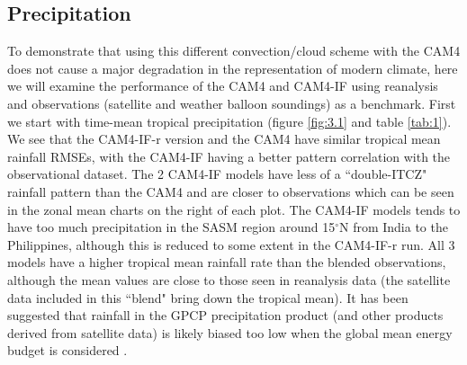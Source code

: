 \documentclass[letterpaper,12pt,titlepage,oneside,final]{book}
\begin{document}
\subsection{Precipitation}
To demonstrate that using this different convection/cloud scheme with the CAM4 does not cause a major degradation in the representation of modern climate, here we will examine the performance of the CAM4 and CAM4-IF using reanalysis and observations (satellite and weather balloon soundings) as a benchmark. First we start with time-mean tropical precipitation (figure \ref{fig:3.1} and table \ref{tab:1}). We see that the CAM4-IF-r version and the CAM4 have similar tropical mean rainfall RMSEs, with the CAM4-IF having a better pattern correlation with the observational dataset. The 2 CAM4-IF models  have less of a ``double-ITCZ" rainfall pattern than the CAM4 and are closer to observations which can be seen in the zonal mean charts on the right of each plot. The CAM4-IF models tends to have too much precipitation in the SASM region around 15$^\circ$N from India to the Philippines, although this is reduced to some extent in the CAM4-IF-r run. All 3 models have a higher tropical mean rainfall rate than the blended observations, although the mean values are close to those seen in reanalysis data (the satellite data included in this ``blend" bring down the tropical mean). It has been suggested that rainfall in the GPCP precipitation product (and other products derived from satellite data) is likely biased too low when the global mean energy budget is considered \citep{trenberth_earths_2009,trenberth_regional_2013}.
\end{document}
